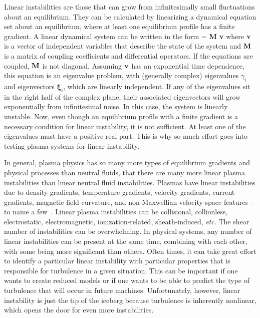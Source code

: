 Linear instabilities are those that can grow from infinitesimally small fluctuations about an equilibrium. They can be calculated by linearizing a dynamical equation set about an equilibrium, where
at least one equilibrium profile has a finite gradient. A linear dynamical system can be written in the form
\beq
\label{dyn_sys_lin}
 = {\bf M v}
\eeq
where ${\bf v}$ is a vector of independent variables that describe the state of the system and ${\bf M}$ is a matrix of coupling coefficients and differential operators. If the equations are
coupled, ${\bf M}$ is not diagonal. Assuming ${\bf v}$ has an exponential time dependence, this equation is an eigenvalue problem, with (generally complex) eigenvalues $\gamma_i$
and eigenvectors $\bm{\xi}_i$, which are linearly independent. If any of the eigenvalues sit in the right half of the complex plane, their associated eigenvectors will grow exponentially
from infinitesimal noise. In this case, the system is linearly unstable. Now, even though an equilibrium profile with a finite gradient is a necessary
condition for linear instability, it is not sufficient. At least one of the eigenvalues must have a positive real part. This is why so much effort goes into testing plasma systems
for linear instability.

In general, plasma physics has so many more types of equilibrium gradients and physical processes than neutral fluids, that there are many more linear plasma instabilities than
linear neutral fluid instabilities. Plasmas have linear instabilities due to density gradients, temperature gradients, velocity gradients, current gradients, magnetic field curvature,
and non-Maxwellian velocity-space features -- to name a few~\cite{wesson2004,chen2006}. 
Linear plasma instabilities can be collisional, collionless, electrostatic, electromagnetic, ionization-related, sheath-induced, \emph{etc}. The shear number of instabilities can be overwhelming.
In physical systems, any number of linear instabilities can be present at the same time, combining with each other, with some being more significant than others. Often times, it can take
great effort to identify a particular linear instability with particular properties that is responsible for turbulence in a given situation. This can be important if one wants to create reduced
models or if one wants to be able to predict the type of turbulence that will occur in future machines. Unfortunately, however, linear instability is just the tip of the iceberg because
turbulence is inherently nonlinear, which opens the door for even more instabilities.


